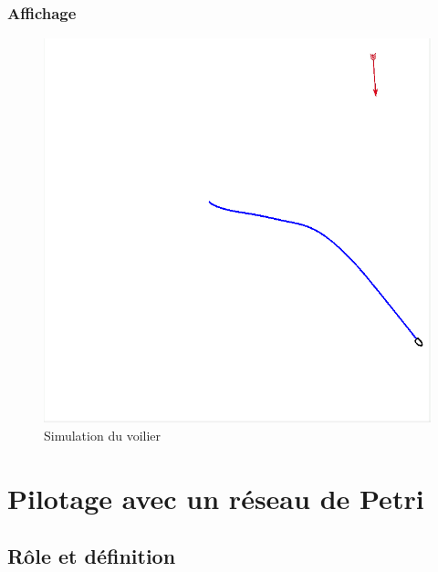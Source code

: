 \documentclass{beamer}
\begin{document}
\begin{frame}\frametitle{Affichage}
\begin{figure}
\includegraphics[scale=0.3]{Screenshot.png} 
\caption{Simulation du voilier}
\end{figure}
\end{frame}

\section{Pilotage avec un réseau de Petri}

\subsection{Rôle et définition }
\end{document}
